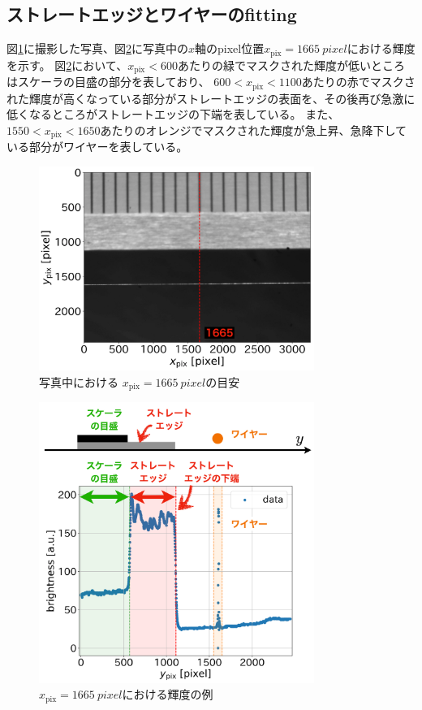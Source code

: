 \documentclass[../../main.tex]{subfiles}
\begin{document}
\subsection{ストレートエッジとワイヤーのfitting}
図\ref{fig:wiresag_edge_target}に撮影した写真、図\ref{fig:wiresag_edge_brightness}に写真中の$x$軸のpixel位置$x_{\mathrm{pix}}=\SI{1665}{pixel}$における輝度を示す。
図\ref{fig:wiresag_edge_brightness}において、$x_{\mathrm{pix}}<600$あたりの緑でマスクされた輝度が低いところはスケーラの目盛の部分を表しており、
$600 < x_{\mathrm{pix}} < 1100$あたりの赤でマスクされた輝度が高くなっている部分がストレートエッジの表面を、その後再び急激に低くなるところがストレートエッジの下端を表している。
また、$1550 < x_{\mathrm{pix}} < 1650$あたりのオレンジでマスクされた輝度が急上昇、急降下している部分がワイヤーを表している。
\begin{figure}[H]
    \centering
    \includegraphics[width=0.8\textwidth]{wiresag/wiresag_edge_target1.pdf}
    \caption{写真中における $x_{\mathrm{pix}}=\SI{1665}{pixel}$の目安}
    \label{fig:wiresag_edge_target}
\end{figure}
\begin{figure}[H]
    \centering
    \includegraphics[width=0.8\textwidth]{wiresag/wiresag_edge_target.pdf}
    \caption{$x_{\mathrm{pix}}=\SI{1665}{pixel}$における輝度の例}
    \label{fig:wiresag_edge_brightness}
\end{figure}
\end{document}
